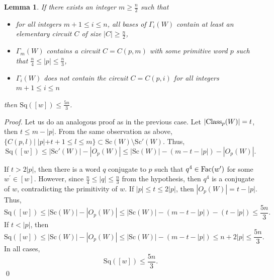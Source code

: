 \documentclass[runningheads,envcountsame,a4paper]{llncs}
\newtheorem{lem}[thm]{Lemma}
\newcommand{\fac}{\hbox{\rm Fac}}
\newcommand{\Class}{\hbox{\rm Class}}
\newcommand{\sq}{\mathrm{Sq}}
\renewcommand{\sc}{\mathrm{Sc}}
\begin{document}
\begin{lem}\label{Case3}
If there exists an integer $m\geq\frac{n}{2}$ such that 
\begin{itemize}
    \item[1] for all integers $m+1\leq i \leq n$, all bases of $\Gamma_i(W)$ contain at least an elementary circuit $C$ of size $|C| \geq \frac{n}{2}$,
    \item[2]$\Gamma_m(W)$ contains a circuit $C=C(p,m)$ with some primitive word $p$ such that $\frac{n}{4}\leq |p| \leq \frac{n}{3}$,
    \item[3]$\Gamma_i(W)$ does not contain the circuit $C=C(p,i)$ for all integers $m+1 \leq i \leq n$
\end{itemize}
 then $\sq([w])\leq \frac{5n}{3}$.
\end{lem}

\begin{proof}
 Let us do an analogous proof as in the previous case. Let $|\Class_p(W)|=t$, then $t \leq m-|p|$. From the same observation as above, $\{C(p,l)| \;|p|+t+1 \leq l\leq m\} \subset \sc(W)\setminus\sc'(W).$
Thus,
$$\sq([w]) \leq |\sc'(W)|-|O_p(W)| \leq |\sc(W)|-(m-t-|p|)- |O_p(W)|.$$

If $t>2|p|$, then there is a word $q$ conjugate to $p$ such that $q^4 \in \fac(w^{\prime})$ for some $w^{\prime}\in [w]$. However, since $\frac{n}{4}\leq |q| \leq \frac{n}{3}$ from the hypothesis, then $q^4$ is a conjugate of $w$, contradicting the primitivity of $w$. 
If $|p| \leq t \leq 2|p|$, then $|O_p(W)|=t-|p|$. Thus,
$$\sq([w]) \leq |\sc(W)|-|O_p(W)| \leq |\sc(W)|-(m-t-|p|)- (t-|p|)\leq \frac{5n}{3}.$$
If $ t < |p|$, then
$$\sq([w]) \leq |\sc(W)|-|O_p(W)| \leq |\sc(W)|-(m-t-|p|)\leq n+2|p|\leq \frac{5n}{3}.$$
In all cases,
$$\sq([w])\leq \frac{5n}{3}.$$ \qed
\end{proof}
\end{document}
